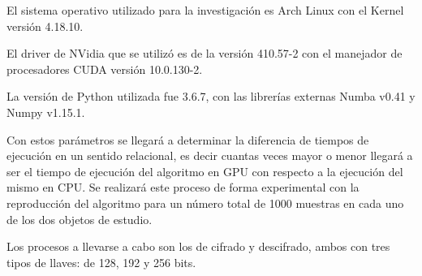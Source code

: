 \documentclass[../main/main.tex]{subfiles}
\begin{document}
  El sistema operativo utilizado para la investigación es Arch Linux con el Kernel versión 4.18.10.

  El driver de NVidia que se utilizó es de la versión 410.57-2 con el manejador de procesadores CUDA versión 10.0.130-2.

  La versión de Python utilizada fue 3.6.7, con las librerías externas Numba v0.41 y Numpy v1.15.1.

  Con estos parámetros se llegará a determinar la diferencia de tiempos de ejecución en un sentido relacional, es decir cuantas veces mayor o menor llegará a ser el tiempo de ejecución del algoritmo en GPU con respecto a la ejecución del mismo en CPU. Se realizará este proceso de forma experimental con la reproducción del algoritmo para un número total de 1000 muestras en cada uno de los dos objetos de estudio.

  Los procesos a llevarse a cabo son los de cifrado y descifrado, ambos con tres tipos de llaves: de 128, 192 y 256 bits.
\end{document}
